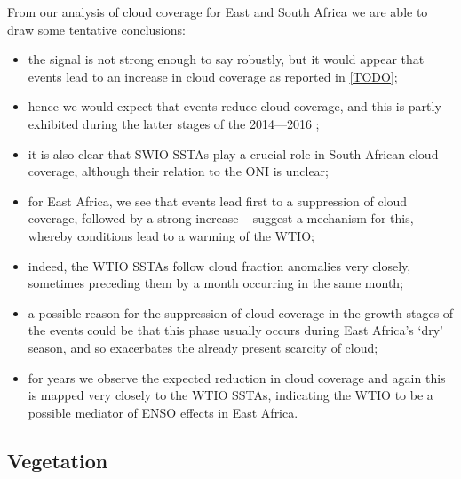 From our analysis of cloud coverage for East and South Africa we are
able to draw some tentative conclusions:
\begin{itemize}
  \item{the signal is not strong enough to say robustly, but it would
    appear that \nina{} events lead to an increase in cloud coverage
    as reported in \ref{TODO};}
  \item{hence we would expect that \elnino{} events reduce cloud
    coverage, and this is partly exhibited during the latter stages of the
    2014---2016 \elnino{};}
  \item{it is also clear that SWIO SSTAs play a crucial role in South
    African cloud coverage, although their relation to the ONI is
    unclear;}
  \item{for East Africa, we see that \elnino{} events lead first to a
    suppression of cloud coverage, followed by a strong increase --
    \cite{parhi2016} suggest a mechanism for this, whereby \elnino{}
    conditions lead to a warming of the WTIO;}
  \item{indeed, the WTIO SSTAs follow cloud fraction anomalies very
    closely, sometimes preceding them by a month occurring in the same
    month;}
  \item{a possible reason for the suppression of cloud coverage in the
    growth stages of the \elnino{} events could be that this phase
    usually occurs during East Africa's `dry' season, and so
    exacerbates the already present scarcity of cloud;}
  \item{for \nina{} years we observe the expected reduction in cloud
    coverage and again this is mapped very closely to the WTIO SSTAs,
    indicating the WTIO to be a possible mediator of ENSO effects in
    East Africa.}
\end{itemize}

\subsection{Vegetation} 

